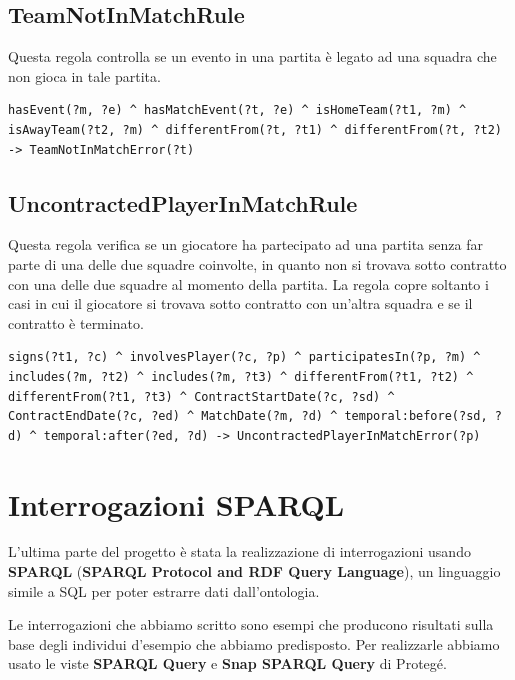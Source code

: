 \documentclass[11pt]{report} %
\begin{document}
\section{TeamNotInMatchRule}

Questa regola controlla se un evento in una partita è legato ad una squadra che non gioca in tale partita.

\begin{lstlisting}[language=SWRL]
hasEvent(?m, ?e) ^ hasMatchEvent(?t, ?e) ^ isHomeTeam(?t1, ?m) ^ isAwayTeam(?t2, ?m) ^ differentFrom(?t, ?t1) ^ differentFrom(?t, ?t2) -> TeamNotInMatchError(?t)
\end{lstlisting}

\newpage

\section{UncontractedPlayerInMatchRule}

Questa regola verifica se un giocatore ha partecipato ad una partita senza far parte di una delle due squadre coinvolte, in quanto non si trovava sotto contratto con una delle due squadre al momento della partita.
La regola copre soltanto i casi in cui il giocatore si trovava sotto contratto con un'altra squadra e se il contratto è terminato.

\begin{lstlisting}[language=SWRL]
signs(?t1, ?c) ^ involvesPlayer(?c, ?p) ^ participatesIn(?p, ?m) ^ includes(?m, ?t2) ^ includes(?m, ?t3) ^ differentFrom(?t1, ?t2) ^ differentFrom(?t1, ?t3) ^ ContractStartDate(?c, ?sd) ^ ContractEndDate(?c, ?ed) ^ MatchDate(?m, ?d) ^ temporal:before(?sd, ?d) ^ temporal:after(?ed, ?d) -> UncontractedPlayerInMatchError(?p)
\end{lstlisting}

\chapter{Interrogazioni SPARQL}

L'ultima parte del progetto è stata la realizzazione di interrogazioni usando \textbf{SPARQL} (\textbf{SPARQL Protocol and RDF Query Language}), un linguaggio simile a SQL per poter estrarre dati dall'ontologia.

\hfill

Le interrogazioni che abbiamo scritto sono esempi che producono risultati sulla base degli individui d'esempio che abbiamo predisposto. 
Per realizzarle abbiamo usato le viste \textbf{SPARQL Query} e \textbf{Snap SPARQL Query} di Protegé. 
\end{document}
